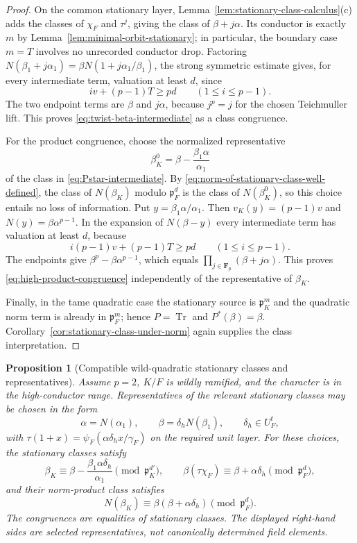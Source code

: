 \documentclass[11pt]{amsart}
\newtheorem{proposition}[theorem]{Proposition}
\theoremstyle{definition}
\theoremstyle{remark}
\newcommand{\F}{\mathbf F}
\newcommand{\p}{\mathfrak p}
\newcommand{\Tr}{\operatorname{Tr}}
\begin{document}
\begin{proof}
On the common stationary layer, Lemma~\ref{lem:stationary-class-calculus}(c)
adds the classes of $\chi_F$ and $\tau^j$, giving the class of
$\beta+j\alpha$.  Its conductor is exactly $m$ by
Lemma~\ref{lem:minimal-orbit-stationary}; in particular, the boundary
case $m=T$ involves no unrecorded conductor drop.  Factoring
$N(\beta_1+j\alpha_1)=\beta N(1+j\alpha_1/\beta_1)$, the strong
symmetric estimate gives, for every intermediate term, valuation at
least $d$, since
\[
 iv+(p-1)T\ge pd\qquad(1\le i\le p-1).
\]
The two endpoint terms are $\beta$ and $j\alpha$, because $j^p=j$ for
the chosen Teichmuller lift.  This proves
\eqref{eq:twist-beta-intermediate} as a class congruence.

For the product congruence, choose the normalized representative
\[
 \beta_K^0=\beta-\frac{\beta_1\alpha}{\alpha_1}
\]
of the class in \eqref{eq:Pstar-intermediate}.  By
\eqref{eq:norm-of-stationary-class-well-defined}, the class of
$N(\beta_K)$ modulo $\p_F^d$ is the class of $N(\beta_K^0)$, so this
choice entails no loss of information.  Put
$y=\beta_1\alpha/\alpha_1$.  Then
$v_K(y)=(p-1)v$ and $N(y)=\beta\alpha^{p-1}$.  In the expansion of
$N(\beta-y)$ every intermediate term has valuation at least $d$,
because
\[
 i(p-1)v+(p-1)T\ge pd\qquad(1\le i\le p-1).
\]
The endpoints give $\beta^p-\beta\alpha^{p-1}$, which equals
$\prod_{j\in\F_p}(\beta+j\alpha)$.  This proves
\eqref{eq:high-product-congruence} independently of the representative
of $\beta_K$.

Finally, in the tame quadratic case the stationary source is
$\p_K^m$ and the quadratic norm term is already in $\p_F^m$; hence
$P=\Tr$ and $P^*(\beta)=\beta$.  Corollary~\ref{cor:stationary-class-under-norm}
again supplies the class interpretation.
\end{proof}

\begin{proposition}[Compatible wild-quadratic stationary classes and representatives]
\label{prop:wild-quadratic-high-parameters}
Assume $p=2$, $K/F$ is wildly ramified, and the character is in the
high-conductor range.  Representatives of the relevant stationary
classes may be chosen in the form
\[
 \alpha=N(\alpha_1),\qquad
 \beta=\delta_hN(\beta_1),\qquad \delta_h\in U_F^t,
\]
with
$\tau(1+x)=\psi_F(\alpha\delta_hx/\gamma_F)$ on the required unit
layer.  For these choices, the stationary classes satisfy
\begin{equation}\label{eq:Pstar-wild-two}
 \beta_K\equiv
 \beta-\frac{\beta_1\alpha\delta_h}{\alpha_1}
 \pmod{\p_K^{d'}},
 \qquad
 \beta(\tau\chi_F)\equiv\beta+\alpha\delta_h
 \pmod{\p_F^d},
\end{equation}
and their norm-product class satisfies
\begin{equation}\label{eq:high-product-two}
 N(\beta_K)\equiv\beta(\beta+\alpha\delta_h)
 \pmod{\p_F^d}.
\end{equation}
The congruences are equalities of stationary classes.  The displayed
right-hand sides are selected representatives, not canonically
determined field elements.
\end{proposition}
\end{document}
